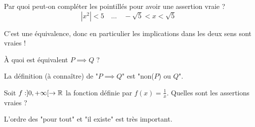 \begin{question}
Par quoi peut-on compléter les pointillés pour avoir une assertion vraie ?
$$|x^2| < 5 \quad \ldots \quad -\sqrt{5} < x < \sqrt{5}$$
\begin{answers}
    \good{$\Longleftarrow$}

    \good{$\implies$}

    \good{$\iff$}

\end{answers}
\begin{explanations}
C'est une équivalence, donc en particulier les implications dans les deux sens sont vraies !
\end{explanations}
\end{question}


\begin{question}
À quoi est équivalent $P \implies Q$ ?
\begin{answers}



\end{answers}
\begin{explanations}
La définition (à connaître) de "$P \implies Q$" est "non($P$) ou $Q$".
\end{explanations}
\end{question}


\begin{question}
Soit $f : ]0,+\infty[ \to \mathbb{R}$ la fonction définie par $f(x) = \frac{1}{x}$. Quelles sont les assertions vraies ?
\begin{answers}
    \good{$\forall x \in ]0,+\infty[ \quad \exists y \in \Rr \qquad y = f(x)$}

    \bad{$\exists x \in ]0,+\infty[ \quad \forall y \in \Rr \qquad y = f(x)$} 
    
    \good{$\exists x \in ]0,+\infty[ \quad \exists y \in \Rr \qquad y = f(x)$}

    \bad{$\forall x \in ]0,+\infty[ \quad \forall y \in \Rr \qquad y = f(x)$}
\end{answers}
\begin{explanations}
L'ordre des "pour tout" et "il existe" est très important.
\end{explanations}
\end{question}


